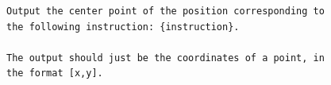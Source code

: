 \begin{figure}[t]
\begin{tcolorbox}[colback=white, width=\linewidth, breakable, enhanced, 
                  title=Prompt for the UI-Venus-1.5 Model, fonttitle=\bfseries]
\lstset{
basicstyle=\scriptsize\ttfamily,
    columns=fullflexible,
    breaklines=true,
    breakatwhitespace=false,
    showstringspaces=false,
    lineskip=-1pt
}

\begin{lstlisting}
Output the center point of the position corresponding to the following instruction: {instruction}.

The output should just be the coordinates of a point, in the format [x,y].

\end{lstlisting}

\end{tcolorbox}
\end{figure}
